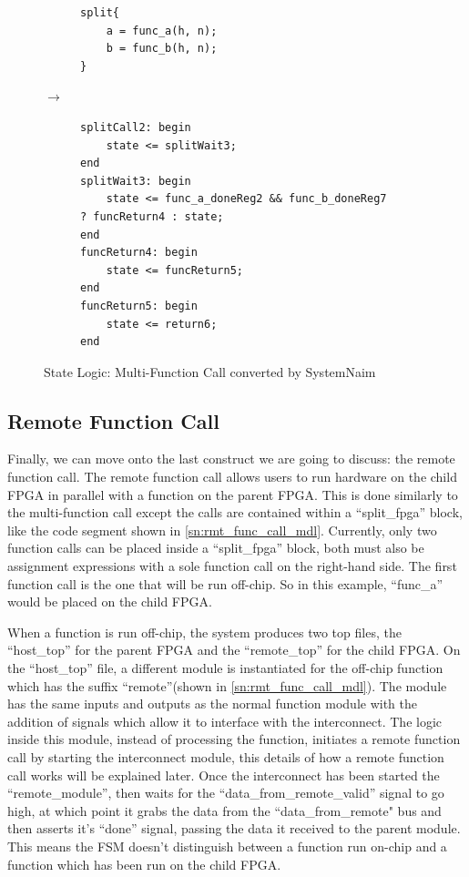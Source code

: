 \begin{figure}[H]
\centering
\begin{subfigure}{0.32\textwidth}
    \centering
    \begin{verbatim}
split{
    a = func_a(h, n);
    b = func_b(h, n);
}
\end{verbatim}
\end{subfigure}%
{\LARGE$\rightarrow$}%
\begin{subfigure}{0.58\textwidth}
    \begin{verbatim}
splitCall2: begin
    state <= splitWait3;
end
splitWait3: begin
    state <= func_a_doneReg2 && func_b_doneReg7 ? funcReturn4 : state;
end
funcReturn4: begin
    state <= funcReturn5;
end
funcReturn5: begin
    state <= return6;
end
    \end{verbatim}
\end{subfigure}
\caption{State Logic: Multi-Function Call converted by SystemNaim}
\label{sn:multi_func_call_state}
\end{figure}

\subsection{Remote Function Call}


Finally, we can move onto the last construct we are going to discuss: the remote function call. The remote function call allows users to run hardware on the child FPGA in parallel with a function on the parent FPGA. This is done similarly to the multi-function call except the calls are contained within a “split\_fpga” block, like the code segment shown in \autoref{sn:rmt_func_call_mdl}. Currently, only two function calls can be placed inside a “split\_fpga” block, both must also be assignment expressions with a sole function call on the right-hand side. The first function call is the one that will be run off-chip. So in this example, “func\_a” would be placed on the child FPGA.

When a function is run off-chip, the system produces two top files, the “host\_top” for the parent FPGA and the “remote\_top” for the child FPGA. On the “host\_top” file, a different module is instantiated for the off-chip function which has the suffix “remote”(shown in \autoref{sn:rmt_func_call_mdl}). The module has the same inputs and outputs as the normal function module with the addition of signals which allow it to interface with the interconnect. The logic inside this module, instead of processing the function, initiates a remote function call by starting the interconnect module, this details of how a remote function call works will be explained later. Once the interconnect has been started the “remote\_module”, then waits for the “data\_from\_remote\_valid” signal to go high, at which point it grabs the data from the “data\_from\_remote" bus and then asserts it's “done” signal, passing the data it received to the parent module. This means the FSM doesn't distinguish between a function run on-chip and a function which has been run on the child FPGA.

